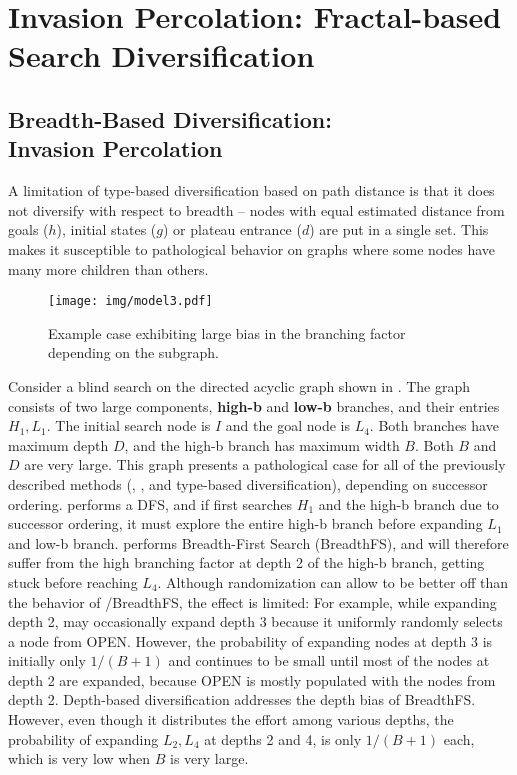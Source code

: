 
\chapter{Invasion Percolation: Fractal-based Search Diversification}


\section{Breadth-Based Diversification:\\ Invasion Percolation}
\label{sec:ip}

A limitation of  type-based diversification based on path distance %
is that it does not diversify with respect to breadth -- 
nodes with equal estimated distance from goals ($h$), initial states ($g$) or plateau entrance ($d$) are put in a single set.
This makes it susceptible to pathological behavior on graphs where some nodes have many more children than others.

\begin{figure}[hbt]
 \centering
 \texttt{[image: img/model3.pdf]}
 \caption{Example case exhibiting large bias in the branching factor depending on the subgraph.}
 \label{fig:model}
\end{figure}

Consider a blind search on the directed acyclic graph
shown in .
The graph consists of two large components, \textbf{high-b} and \textbf{low-b} branches, and their entries $H_1,L_1$. The initial search node is $I$ and the goal node is $L_4$.
Both branches have maximum depth $D$, and the high-b branch has maximum width $B$.
Both $B$ and $D$ are very large.
This graph presents a pathological case for all of the previously described methods (\lifo, \fifo, \ro and type-based diversification), depending on successor ordering.
\lifo performs a DFS, and if \lifo first searches $H_1$ and the high-b branch due to successor ordering, it must explore the entire high-b branch before expanding $L_1$ and low-b branch.
\fifo performs Breadth-First Search (BreadthFS), and  will therefore suffer from the  high branching factor at depth 2 of the high-b branch, getting stuck before reaching $L_4$.
Although randomization can allow \ro to be better off than the behavior of \fifo/BreadthFS, the effect is limited:
For example, while expanding depth 2, \ro may occasionally expand depth 3 because it uniformly randomly selects a node from OPEN.
However, the probability of expanding nodes at depth 3 is initially only $1/(B+1)$ and continues to be small until  most of the nodes at depth 2 are expanded, 
because OPEN is mostly populated with the nodes from depth 2.
Depth-based diversification addresses the depth bias of BreadthFS.
However, even though it distributes the effort among various depths,
the probability of expanding $L_2,L_4$ at depths 2 and 4, is only $1/(B+1)$ each, which is very low when $B$ is very large.

